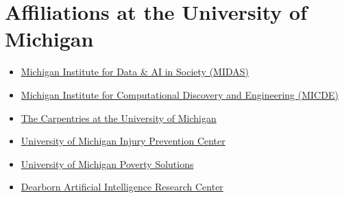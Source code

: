 \documentclass[11pt]{article}
\newenvironment{main}
{\begin{adjustwidth}{3em}{}}
{\end{adjustwidth}}
\begin{document}
\section*{Affiliations at the University of Michigan}
\begin{main}

\begin{itemize}
    \item \href{https://midas.umich.edu/}{Michigan Institute for Data \& AI in Society (MIDAS)}
    \item \href{https://micde.umich.edu/}{Michigan Institute for Computational Discovery and Engineering (MICDE)}
    \item \href{https://umcarpentries.org/}{The Carpentries at the University of Michigan}
    \item \href{https://injurycenter.umich.edu/}{University of Michigan Injury Prevention Center}
    \item \href{https://poverty.umich.edu/}{University of Michigan Poverty Solutions}
    \item \href{https://umdearborn.edu/cecs/research/centers/dearborn-artificial-intelligence-research-dair-center}{Dearborn Artificial Intelligence Research Center}
\end{itemize}


\end{main}
\end{document}
